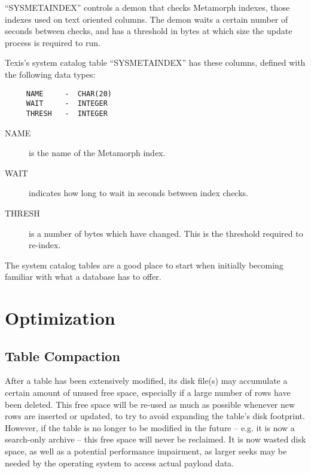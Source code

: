 ``SYSMETAINDEX'' controls a demon that checks Metamorph indexes, those
indexes used on text oriented columns.  The demon waits a certain
number of seconds between checks, and has a threshold in bytes at
which size the update process is required to run.

Texis's system catalog table ``SYSMETAINDEX'' has these columns,
defined with the following data types:

\begin{verbatim}
     NAME     -  CHAR(20)
     WAIT     -  INTEGER
     THRESH   -  INTEGER
\end{verbatim}

\begin{description}

\item[NAME] is the name of the Metamorph index.

\item[WAIT] indicates how long to wait in seconds between index
checks.

\item[THRESH] is a number of bytes which have changed.  This is the
threshold required to re-index.
\end{description}

The system catalog tables are a good place to start when initially
becoming familiar with what a database has to offer.

\section{Optimization}

\subsection{Table Compaction}

  After a table has been extensively modified, its disk file(s) may
accumulate a certain amount of unused free space, especially if a
large number of rows have been deleted.  This free space will be
re-used as much as possible whenever new rows are inserted or updated,
to try to avoid expanding the table's disk footprint.  However, if the
table is no longer to be modified in the future -- e.g. it is now a
search-only archive -- this free space will never be reclaimed.  It is
now wasted disk space, as well as a potential performance impairment,
as larger seeks may be needed by the operating system to access actual
payload data.

